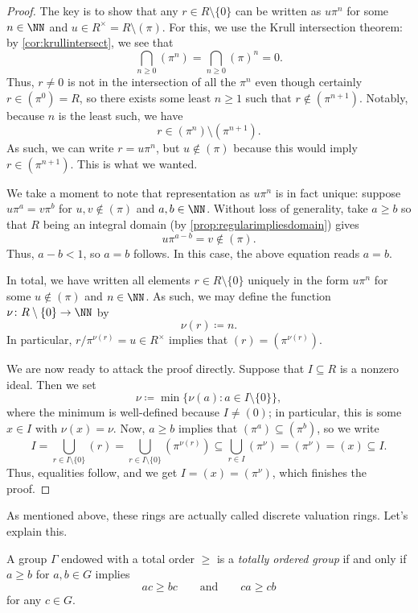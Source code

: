 \documentclass[../notes.tex]{subfiles}
\begin{document}
\begin{proof}
	The key is to show that any $r\in R\setminus\{0\}$ can be written as $u\pi^n$ for some $n\in\NN$ and $u\in R^\times=R\setminus(\pi)$. For this, we use the Krull intersection theorem: by \autoref{cor:krullintersect}, we see that
	\[\bigcap_{n\ge0}\left(\pi^n\right)=\bigcap_{n\ge0}\left(\pi\right)^n=0.\]
	Thus, $r\ne0$ is not in the intersection of all the $\pi^n$ even though certainly $r\in\left(\pi^0\right)=R$, so there exists some least $n\ge1$ such that $r\notin\left(\pi^{n+1}\right)$. Notably, because $n$ is the least such, we have
	\[r\in\left(\pi^n\right)\setminus\left(\pi^{n+1}\right).\]
	As such, we can write $r=u\pi^n$, but $u\notin(\pi)$ because this would imply $r\in\left(\pi^{n+1}\right)$. This is what we wanted.

	We take a moment to note that representation as $u\pi^n$ is in fact unique: suppose $u\pi^a=v\pi^b$ for $u,v\notin(\pi)$ and $a,b\in\NN$. Without loss of generality, take $a\ge b$ so that $R$ being an integral domain (by \autoref{prop:regularimpliesdomain}) gives
	\[u\pi^{a-b}=v\notin(\pi).\]
	Thus, $a-b<1$, so $a=b$ follows. In this case, the above equation reads $a=b$.
	
	In total, we have written all elements $r\in R\setminus\{0\}$ uniquely in the form $u\pi^n$ for some $u\notin(\pi)$ and $n\in\NN$. As such, we may define the function $\nu\colon R\setminus\{0\}\to\NN$ by
	\[\nu(r)\coloneqq n.\]
	In particular, $r/\pi^{\nu(r)}=u\in R^\times$ implies that $(r)=\left(\pi^{\nu(r)}\right)$.
	
	We are now ready to attack the proof directly. Suppose that $I\subseteq R$ is a nonzero ideal. Then we set
	\[\nu\coloneqq\min\{\nu(a):a\in I\setminus\{0\}\},\]
	where the minimum is well-defined because $I\ne(0)$; in particular, this is some $x\in I$ with $\nu(x)=\nu$. Now, $a\ge b$ implies that $\left(\pi^a\right)\subseteq\left(\pi^b\right)$, so we write
	\[I=\bigcup_{r\in I\setminus\{0\}}(r)=\bigcup_{r\in I\setminus\{0\}}\left(\pi^{\nu(r)}\right)\subseteq\bigcup_{r\in I}\left(\pi^\nu\right)=\left(\pi^\nu\right)=(x)\subseteq I.\]
	Thus, equalities follow, and we get $I=(x)=\left(\pi^\nu\right)$, which finishes the proof.
\end{proof}
As mentioned above, these rings are actually called discrete valuation rings. Let's explain this.
\begin{definition}
	A group $\Gamma$ endowed with a total order $\ge$ is a \textit{totally ordered group} if and only if $a\ge b$ for $a,b\in G$ implies
	\[ac\ge bc\qquad\text{and}\qquad ca\ge cb\]
	for any $c\in G$.
\end{definition}
\end{document}
